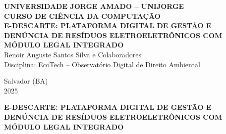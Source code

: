\documentclass[12pt, a4paper]{article}
\numberwithin{equation}{section}
\numberwithin{figure}{section}
\numberwithin{table}{section}
\begin{document}
\begin{titlepage}
  \begin{center}
    {\large \textbf{UNIVERSIDADE JORGE AMADO -- UNIJORGE}}\\[0.3cm]
    {\large \textbf{CURSO DE CIÊNCIA DA COMPUTAÇÃO}}\\[3cm]

    {\Large \textbf{E-DESCARTE: PLATAFORMA DIGITAL DE GESTÃO E DENÚNCIA DE
    RESÍDUOS ELETROELETRÔNICOS COM MÓDULO LEGAL INTEGRADO}}\\[3cm]

    {\normalsize
      Renoir Auguste Santos Silva e Colaboradores\\[0.3cm]
      Disciplina: EcoTech -- Observatório Digital de Direito Ambiental\\[3cm]
    }

    \vfill
    {\normalsize Salvador (BA)\\2025}
  \end{center}
\end{titlepage}

\clearpage
\setcounter{page}{2}

\begin{center}
  {\normalsize\bfseries
  E-DESCARTE: PLATAFORMA DIGITAL DE GESTÃO E DENÚNCIA DE RESÍDUOS
  ELETROELETRÔNICOS COM MÓDULO LEGAL INTEGRADO\\[0.5cm]}
\end{center}
\end{document}
